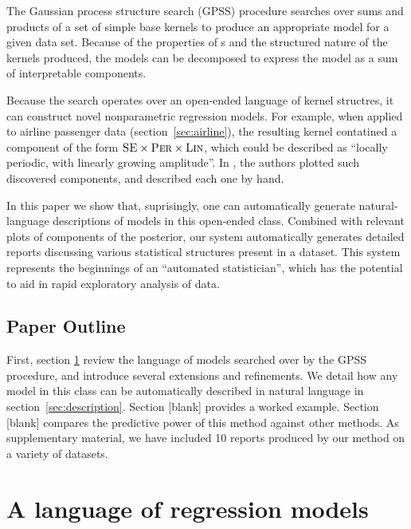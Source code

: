 \documentclass{article}
\begin{document}
The Gaussian process structure search (GPSS) procedure \citep{DuvLloGroetal13} searches over sums and products of a set of simple base kernels to produce an appropriate model for a given data set.
Because of the properties of \gp{}s and the structured nature of the kernels produced, the models can be decomposed to express the model as a sum of interpretable components.

Because the search operates over an open-ended language of kernel structres, it can construct novel nonparametric regression models.
For example, when applied to airline passenger data (section~\ref{sec:airline}), the resulting kernel contatined a component of the form ${\textsc{SE}} \times {\textsc{Per}} \times {\textsc{Lin}}$, which could be described as ``locally periodic, with linearly growing amplitude''. 
In \citep{DuvLloGroetal13}, the authors plotted such discovered components, and described each one by hand.

In this paper we show that, suprisingly, one can automatically generate natural-language descriptions of \gp{} models in this open-ended class.
Combined with relevant plots of components of the posterior, our system automatically generates detailed reports discussing various statistical structures present in a dataset.
This system represents the beginnings of an ``automated statistician'', which has the potential to aid in rapid exploratory analysis of data.

\subsection{Paper Outline}

First, section \ref{sec:improvements} review the language of models searched over by the GPSS procedure, and introduce several extensions and refinements.
We detail how any model in this class can be automatically described in natural language in section~\ref{sec:description}.
Section [blank] provides a worked example.
Section [blank] compares the predictive power of this method against other methods.
As supplementary material, we have included 10 reports produced by our method on a variety of datasets.





\section{A language of regression models}
\label{sec:improvements}
\end{document}
